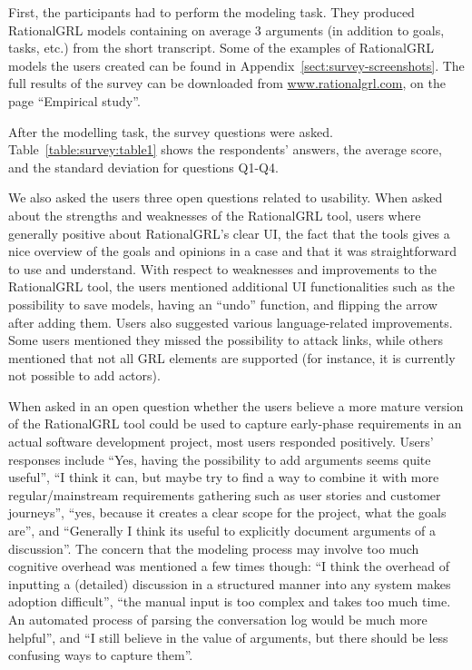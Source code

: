 First, the participants had to perform the modeling task. They produced RationalGRL models containing on average 3 arguments (in addition  to goals, tasks, etc.) from the short transcript. Some of the examples of RationalGRL models the users created can be found in Appendix~\ref{sect:survey-screenshots}. The full results of the survey can be downloaded from \url{www.rationalgrl.com}, on the page ``Empirical study''.

After the modelling task, the survey questions were asked. Table~\ref{table:survey:table1} shows the respondents' answers, the average score, and the standard deviation for questions Q1-Q4. 

We also asked the users three open questions related to usability. When asked about the strengths and weaknesses of the RationalGRL tool, users where generally positive about RationalGRL's clear UI, the fact that the tools gives a nice overview of the goals and opinions in a case and that it was straightforward to use and understand. With respect to weaknesses and improvements to the RationalGRL tool, the users mentioned additional UI functionalities such as the possibility to save models, having an ``undo'' function, and flipping the arrow after adding them. Users also suggested various language-related improvements. Some users mentioned they missed the possibility to attack links, while others mentioned that not all GRL elements are supported (for instance, it is currently not possible to add actors).

When asked in an open question whether the users believe a more mature version of the RationalGRL tool could be used to capture early-phase requirements in an actual software development project, most users responded positively. Users' responses include ``Yes, having the possibility to add arguments seems quite useful'', ``I think it can, but maybe try to find a way to combine it with more regular/mainstream requirements gathering such as user stories and customer journeys'', ``yes, because it creates a clear scope for the project, what the goals are'', and ``Generally I think its useful to explicitly document arguments of a discussion''. The concern that the modeling process may involve too much cognitive overhead was mentioned a few times though: ``I think the overhead of inputting a (detailed) discussion in a structured manner into any system makes adoption difficult'', ``the manual input is too complex and takes too much time. An automated process of parsing the conversation log would be much more helpful'', and ``I still believe in the value of arguments, but there should be less confusing ways to capture them''.

